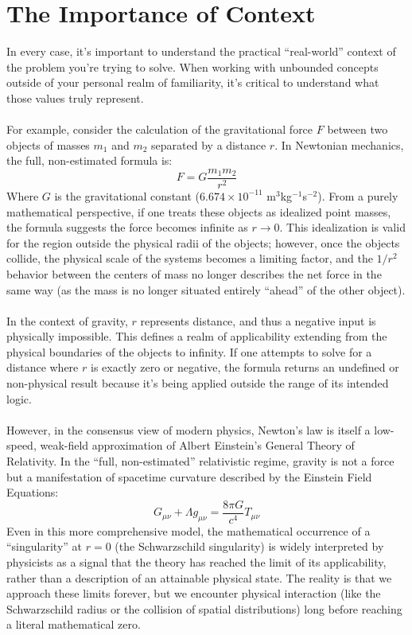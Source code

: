 \documentclass[twoside,twocolumn,9pt]{article}
\begin{document}
\section{The Importance of Context}
In every case, it's important to understand the practical ``real-world'' context of the problem you're trying to solve. When working with unbounded concepts outside of your personal realm of familiarity, it's critical to understand what those values truly represent.\\
\\
For example, consider the calculation of the gravitational force $F$ between two objects of masses $m_1$ and $m_2$ separated by a distance $r$. In Newtonian mechanics, the full, non-estimated formula is:
\begin{equation}
F = G \frac{m_1 m_2}{r^2}
\end{equation}
Where $G$ is the gravitational constant ($6.674 \times 10^{-11}$ m$^3$kg$^{-1}$s$^{-2}$). From a purely mathematical perspective, if one treats these objects as idealized point masses, the formula suggests the force becomes infinite as $r \to 0$. This idealization is valid for the region outside the physical radii of the objects; however, once the objects collide, the physical scale of the systems becomes a limiting factor, and the $1/r^2$ behavior between the centers of mass no longer describes the net force in the same way (as the mass is no longer situated entirely ``ahead'' of the other object).\\
\\
In the context of gravity, $r$ represents distance, and thus a negative input is physically impossible. This defines a realm of applicability extending from the physical boundaries of the objects to infinity. If one attempts to solve for a distance where $r$ is exactly zero or negative, the formula returns an undefined or non-physical result because it's being applied outside the range of its intended logic.\\
\\
However, in the consensus view of modern physics, Newton's law is itself a low-speed, weak-field approximation of Albert Einstein's General Theory of Relativity. In the ``full, non-estimated'' relativistic regime, gravity is not a force but a manifestation of spacetime curvature described by the Einstein Field Equations:
\begin{equation}
G_{\mu\nu} + \Lambda g_{\mu\nu} = \frac{8\pi G}{c^4} T_{\mu\nu}
\end{equation}
Even in this more comprehensive model, the mathematical occurrence of a ``singularity'' at $r=0$ (the Schwarzschild singularity) is widely interpreted by physicists as a signal that the theory has reached the limit of its applicability, rather than a description of an attainable physical state. The reality is that we approach these limits forever, but we encounter physical interaction (like the Schwarzschild radius or the collision of spatial distributions) long before reaching a literal mathematical zero.
\end{document}
